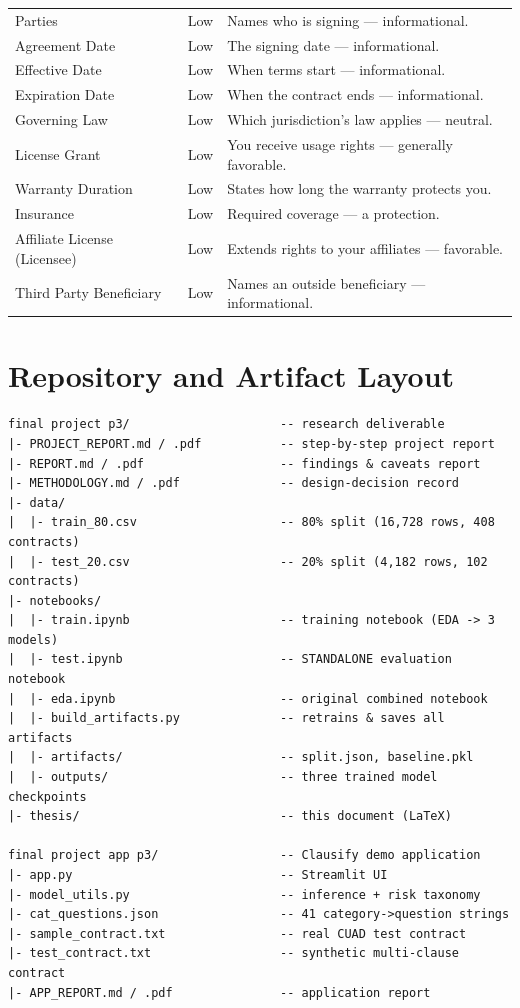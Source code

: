 \begin{longtable}{p{4.6cm} c p{7.6cm}}
Parties & \textcolor{risklow}{Low} & Names who is signing --- informational.\\
Agreement Date & \textcolor{risklow}{Low} & The signing date --- informational.\\
Effective Date & \textcolor{risklow}{Low} & When terms start --- informational.\\
Expiration Date & \textcolor{risklow}{Low} & When the contract ends --- informational.\\
Governing Law & \textcolor{risklow}{Low} & Which jurisdiction's law applies --- neutral.\\
License Grant & \textcolor{risklow}{Low} & You receive usage rights --- generally favorable.\\
Warranty Duration & \textcolor{risklow}{Low} & States how long the warranty protects you.\\
Insurance & \textcolor{risklow}{Low} & Required coverage --- a protection.\\
Affiliate License (Licensee) & \textcolor{risklow}{Low} & Extends rights to your affiliates --- favorable.\\
Third Party Beneficiary & \textcolor{risklow}{Low} & Names an outside beneficiary --- informational.\\
\bottomrule
\end{longtable}

\chapter{Repository and Artifact Layout}
\label{app:repo}

\begin{verbatim}
final project p3/                     -- research deliverable
|- PROJECT_REPORT.md / .pdf           -- step-by-step project report
|- REPORT.md / .pdf                   -- findings & caveats report
|- METHODOLOGY.md / .pdf              -- design-decision record
|- data/
|  |- train_80.csv                    -- 80% split (16,728 rows, 408 contracts)
|  |- test_20.csv                     -- 20% split (4,182 rows, 102 contracts)
|- notebooks/
|  |- train.ipynb                     -- training notebook (EDA -> 3 models)
|  |- test.ipynb                      -- STANDALONE evaluation notebook
|  |- eda.ipynb                       -- original combined notebook
|  |- build_artifacts.py              -- retrains & saves all artifacts
|  |- artifacts/                      -- split.json, baseline.pkl
|  |- outputs/                        -- three trained model checkpoints
|- thesis/                            -- this document (LaTeX)

final project app p3/                 -- Clausify demo application
|- app.py                             -- Streamlit UI
|- model_utils.py                     -- inference + risk taxonomy
|- cat_questions.json                 -- 41 category->question strings
|- sample_contract.txt                -- real CUAD test contract
|- test_contract.txt                  -- synthetic multi-clause contract
|- APP_REPORT.md / .pdf               -- application report
\end{verbatim}
